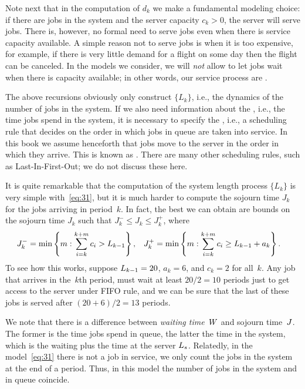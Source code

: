 \documentclass[stochastic-or.tex]{subfiles}
\begin{document}
Note next that in the computation of $d_{k}$ we make a fundamental modeling choice: if there are jobs in the system and the server capacity $c_{k} > 0$, the server will serve jobs.
There is, however, no formal need to serve jobs even when there is service capacity available.
A simple reason not to serve jobs is when it is too expensive, for example, if there is very little demand for a flight on some day then the flight can be canceled.
In the models we consider, we will \emph{not} allow to let jobs wait when there is capacity available; in other words, our service process are .

The above recursions obviously only construct $\{L_k\}$, i.e., the dynamics of the number of jobs in the system.
If we also need information about the , i.e., the time jobs spend in the system, it is necessary to specify the , i.e., a scheduling rule that decides on the order in which jobs in queue are taken into service.
In this book we assume henceforth that jobs move to the server  in the order in which they arrive.
This is known as .
There are many other scheduling rules, such as Last-In-First-Out; we do not discuss these here.

It is quite remarkable that the computation of the system length process $\{L_{k}\}$ is very simple with~\cref{eq:31}, but it is much harder to compute the sojourn time $J_{k}$ for the jobs arriving in period~$k$.
In fact, the best we can obtain are bounds on the sojourn time $J_{k}$ such that $J_k^{-} \leq J_{k}\leq J_k^{+}$, where
 \begin{align*}
 J_{k}^{-} &= \min\left\{m: \sum_{i=k}^{k+m} c_i > L_{k-1}\right\}, &
 J_{k}^{+} &= \min\left\{m: \sum_{i=k}^{k+m} c_i \geq  L_{k-1}+a_k\right\}.
 \end{align*}
 To see how this works, suppose $L_{k-1}=20$, $a_{k}=6$, and $c_k=2$ for all~$k$.
Any job that arrives in the~$k$th period, must wait at least $20/2 = 10$ periods just to get access to the server under FIFO rule, and we can be sure that the last of these jobs is served after $(20+6)/2=13$ periods.

We note that there is a difference between \emph{waiting time}~$W$ and sojourn time~$J$.
The former is the time jobs spend in queue, the latter the time in the system, which is the waiting plus the time at the server $L_s$.
Relatedly, in the model~\cref{eq:31} there is not a job in service, we only count the jobs in the system at the end of a period. Thus, in this model the number of jobs in the system and in queue coincide.
\end{document}
